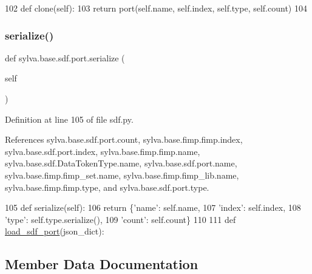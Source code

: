 \begin{DoxyCode}
102         \textcolor{keyword}{def }clone(self):
103             \textcolor{keywordflow}{return} port(self.name, self.index, self.type, self.count)
104 
\end{DoxyCode}
\mbox{\label{classsylva_1_1base_1_1sdf_1_1port_a19793d8e6190538a7d5cd014b08441b4}} 
\subsubsection{\texorpdfstring{serialize()}{serialize()}}
{\footnotesize\ttfamily def sylva.\+base.\+sdf.\+port.\+serialize (\begin{DoxyParamCaption}\item[{}]{self }\end{DoxyParamCaption})}



Definition at line 105 of file sdf.\+py.



References sylva.\+base.\+sdf.\+port.\+count, sylva.\+base.\+fimp.\+fimp.\+index, sylva.\+base.\+sdf.\+port.\+index, sylva.\+base.\+fimp.\+fimp.\+name, sylva.\+base.\+sdf.\+Data\+Token\+Type.\+name, sylva.\+base.\+sdf.\+port.\+name, sylva.\+base.\+fimp.\+fimp\+\_\+set.\+name, sylva.\+base.\+fimp.\+fimp\+\_\+lib.\+name, sylva.\+base.\+fimp.\+fimp.\+type, and sylva.\+base.\+sdf.\+port.\+type.


\begin{DoxyCode}
105         \textcolor{keyword}{def }serialize(self):
106             \textcolor{keywordflow}{return} \{\textcolor{stringliteral}{'name'}: self.name,
107                     \textcolor{stringliteral}{'index'}: self.index,
108                     \textcolor{stringliteral}{'type'}: self.type.serialize(),
109                     \textcolor{stringliteral}{'count'}: self.count\}
110 
111     \textcolor{keyword}{def }\hyperlink{namespacesylva_1_1base_1_1sdf_a72bbd0e1cd0a666269ac3f17427954b8}{load\_sdf\_port}(json\_dict):
\end{DoxyCode}


\subsection{Member Data Documentation}
\mbox{\label{classsylva_1_1base_1_1sdf_1_1port_a14e2fb1373bce5c98b5f779012db8a0b}} 
